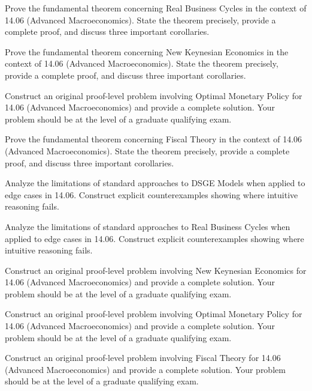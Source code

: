 \documentclass[12pt,a4paper]{exam}
\begin{document}
\begin{questions}
\vspace{0.3cm}

\question[5]
Prove the fundamental theorem concerning Real Business Cycles in the context of 14.06 (Advanced Macroeconomics). State the theorem precisely, provide a complete proof, and discuss three important corollaries.

\vspace{0.3cm}

\question[4]
Prove the fundamental theorem concerning New Keynesian Economics in the context of 14.06 (Advanced Macroeconomics). State the theorem precisely, provide a complete proof, and discuss three important corollaries.

\vspace{0.3cm}

\question[3]
Construct an original proof-level problem involving Optimal Monetary Policy for 14.06 (Advanced Macroeconomics) and provide a complete solution. Your problem should be at the level of a graduate qualifying exam.

\vspace{0.3cm}

\question[4]
Prove the fundamental theorem concerning Fiscal Theory in the context of 14.06 (Advanced Macroeconomics). State the theorem precisely, provide a complete proof, and discuss three important corollaries.

\vspace{0.3cm}

\question[2]
Analyze the limitations of standard approaches to DSGE Models when applied to edge cases in 14.06. Construct explicit counterexamples showing where intuitive reasoning fails.

\vspace{0.3cm}

\question[7]
Analyze the limitations of standard approaches to Real Business Cycles when applied to edge cases in 14.06. Construct explicit counterexamples showing where intuitive reasoning fails.

\vspace{0.3cm}

\question[3]
Construct an original proof-level problem involving New Keynesian Economics for 14.06 (Advanced Macroeconomics) and provide a complete solution. Your problem should be at the level of a graduate qualifying exam.

\vspace{0.3cm}

\question[4]
Construct an original proof-level problem involving Optimal Monetary Policy for 14.06 (Advanced Macroeconomics) and provide a complete solution. Your problem should be at the level of a graduate qualifying exam.

\vspace{0.3cm}

\question[6]
Construct an original proof-level problem involving Fiscal Theory for 14.06 (Advanced Macroeconomics) and provide a complete solution. Your problem should be at the level of a graduate qualifying exam.

\vspace{0.3cm}

\end{questions}
\end{document}
